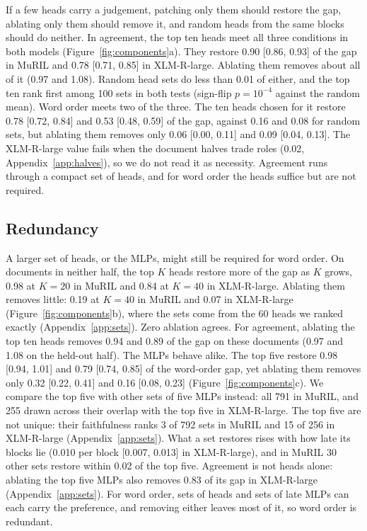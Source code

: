 \documentclass[11pt]{article}
\begin{document}
If a few heads carry a judgement, patching only them should restore the gap, ablating only them should remove it, and random heads from the same blocks should do neither.
In agreement, the top ten heads meet all three conditions in both models (Figure~\ref{fig:components}a).
They restore 0.90 [0.86, 0.93] of the gap in MuRIL and 0.78 [0.71, 0.85] in XLM-R-large.
Ablating them removes about all of it (0.97 and 1.08).
Random head sets do less than 0.01 of either, and the top ten rank first among 100 sets in both tests (sign-flip $p=10^{-4}$ against the random mean).
Word order meets two of the three.
The ten heads chosen for it restore 0.78 [0.72, 0.84] and 0.53 [0.48, 0.59] of the gap, against 0.16 and 0.08 for random sets, but ablating them removes only 0.06 [0.00, 0.11] and 0.09 [0.04, 0.13].
The XLM-R-large value fails when the document halves trade roles (0.02, Appendix~\ref{app:halves}), so we do not read it as necessity.
Agreement runs through a compact set of heads, and for word order the heads suffice but are not required.

\subsection{Redundancy}
\label{sec:redundancy}

A larger set of heads, or the MLPs, might still be required for word order.
On documents in neither half, the top $K$ heads restore more of the gap as $K$ grows, 0.98 at $K=20$ in MuRIL and 0.84 at $K=40$ in XLM-R-large.
Ablating them removes little: 0.19 at $K=40$ in MuRIL and 0.07 in XLM-R-large (Figure~\ref{fig:components}b), where the sets come from the 60 heads we ranked exactly (Appendix~\ref{app:sets}).
Zero ablation agrees.
For agreement, ablating the top ten heads removes 0.94 and 0.89 of the gap on these documents (0.97 and 1.08 on the held-out half).
The MLPs behave alike.
The top five restore 0.98 [0.94, 1.01] and 0.79 [0.74, 0.85] of the word-order gap, yet ablating them removes only 0.32 [0.22, 0.41] and 0.16 [0.08, 0.23] (Figure~\ref{fig:components}c).
We compare the top five with other sets of five MLPs instead: all 791 in MuRIL, and 255 drawn across their overlap with the top five in XLM-R-large.
The top five are not unique: their faithfulness ranks 3 of 792 sets in MuRIL and 15 of 256 in XLM-R-large (Appendix~\ref{app:sets}).
What a set restores rises with how late its blocks lie (0.010 per block [0.007, 0.013] in XLM-R-large), and in MuRIL 30 other sets restore within 0.02 of the top five.
Agreement is not heads alone: ablating the top five MLPs also removes 0.83 of its gap in XLM-R-large (Appendix~\ref{app:sets}).
For word order, sets of heads and sets of late MLPs can each carry the preference, and removing either leaves most of it, so word order is redundant.
\end{document}
